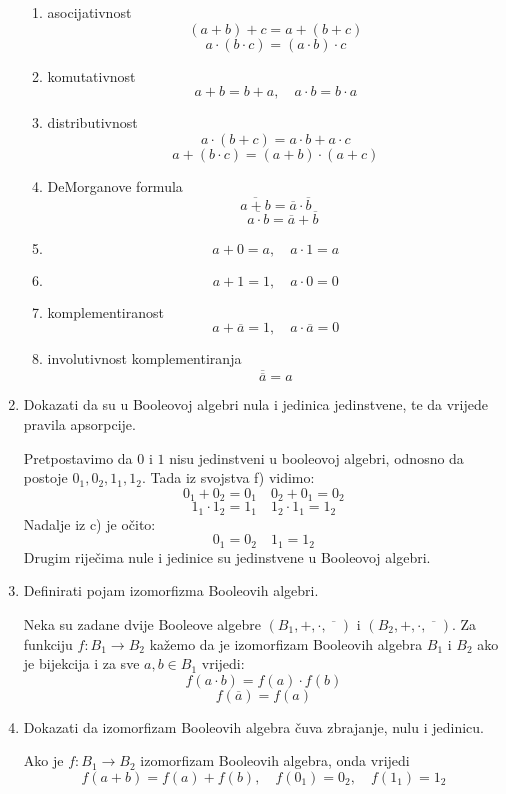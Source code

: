 \documentclass{article}
\begin{document}
\begin{enumerate}
\begin{enumerate}
\item asocijativnost
$$(a + b) + c = a + (b + c)$$
$$a\cdot(b\cdot c) = (a\cdot b)\cdot c$$

\item komutativnost
$$a + b = b + a,\quad a\cdot b = b\cdot a$$

\item distributivnost 
$$a\cdot(b + c) = a\cdot b + a\cdot c$$
$$a + (b\cdot c) = (a + b)\cdot (a + c)$$

\item DeMorganove formula 
$$\overline{a+b} = \overline{a}\cdot\overline{b}$$
$$\quad\overline{a\cdot b} = \overline{a}+\overline{b}$$

\item $$a + 0 = a,\quad a\cdot1 = a$$

\item $$a + 1 = 1, \quad a\cdot 0 = 0$$

\item komplementiranost 
$$a + \overline{a} = 1,\quad a\cdot\overline{a} = 0$$

\item involutivnost komplementiranja
$$\overline{\overline{a}} = a$$

\end{enumerate}

\item Dokazati da su u Booleovoj algebri nula i jedinica jedinstvene, te da vrijede pravila apsorpcije.

Pretpostavimo da $0$ i $1$ nisu jedinstveni u booleovoj algebri, odnosno da postoje $0_1, 0_2, 1_1, 1_2$. Tada iz svojstva f) vidimo:
$$0_1 + 0_2 = 0_1\quad 0_2 + 0_1 = 0_2$$
$$1_1\cdot1_2 = 1_1\quad 1_2\cdot1_1 = 1_2$$
Nadalje iz c) je očito:
$$0_1 = 0_2\quad 1_1 = 1_2$$
Drugim riječima nule i jedinice su jedinstvene u Booleovoj algebri.

\item Definirati pojam izomorfizma Booleovih algebri.

Neka su zadane dvije Booleove algebre $(B_1, +, \cdot, \overline{\phantom{m}})$ i $(B_2, +, \cdot, \overline{\phantom{m}})$. Za funkciju $f: B_1\rightarrow B_2$ kažemo da je izomorfizam Booleovih algebra $B_1$ i $B_2$ ako je bijekcija i za sve $a, b\in B_1$ vrijedi:
$$f(a\cdot b) = f(a)\cdot f(b)$$
$$f(\overline{a}) = f(a)$$

\item Dokazati da izomorfizam Booleovih algebra čuva zbrajanje, nulu i jedinicu.

Ako je $f: B_1\rightarrow B_2$ izomorfizam Booleovih algebra, onda vrijedi
$$f(a+b) = f(a) + f(b),\quad f(0_1) = 0_2, \quad f(1_1) = 1_2$$


\end{enumerate}
\end{document}
